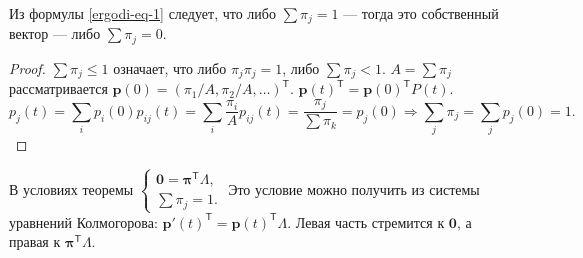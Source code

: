     \begin{corollary}
    Из формулы \eqref{ergodi-eq-1} следует, что либо $\sum \pi_j = 1$ --- тогда это
      собственный вектор --- либо $\sum \pi_j = 0$.

      \begin{proof}
        $\sum \pi_j \leqslant 1$ означает, что либо $\pi_j \pi_j = 1$, либо
        $\sum \pi_j < 1$. 
        $A = \sum \pi_j$ рассматривается
        $\mathbf p(0) = \left( \pi_1/A, \pi_2/A, \dots
        \right)^{\mathsf T}$.
        $\mathbf p(t)^{\mathsf T} = \mathbf p(0)^{\mathsf T} P(t)$.
        \[
          p_j(t) = \sum_i p_i(0) p_{ij}(t) = \sum_i \dfrac{\pi_i}{A} p_{ij}(t)
          = \dfrac{\pi_j}{\sum \pi_k} = p_j(0)
          \Rightarrow
          \sum_j \pi_j = \sum_j p_j(0) = 1.
        \]
      \end{proof}
    \end{corollary}
      \begin{corollary} 
        В условиях теоремы $\begin{cases} \mathbf{0} = \bm\pi^{\mathsf T}
        \Lambda, \\ \sum \pi_j = 1.\end{cases}$
      Это условие можно получить из системы уравнений Колмогорова:
      $\mathbf p'(t)^{\mathsf T} = \mathbf p(t)^{\mathsf T} \Lambda$. Левая часть
      стремится к $\mathbf{0}$, а
      правая к $\bm\pi^{\mathsf T} \Lambda$.
\end{corollary}



